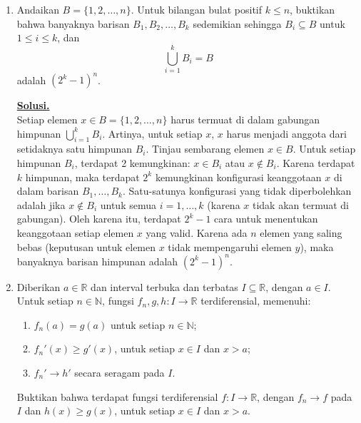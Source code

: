 \documentclass[12pt,twoside]{article}
\newenvironment{solution}
{
	\par\noindent\textbf{\underline{Solusi.}}\\
}
{
	\par
}
\begin{document}
\begin{enumerate}
  \item Andaikan $B = \{1, 2, \dots, n\}$. Untuk bilangan bulat positif $k \leq n$, buktikan bahwa banyaknya barisan $B_1, B_2, \dots, B_k$ sedemikian sehingga $B_i \subseteq B$ untuk $1 \leq i \leq k$, dan
        \[
          \bigcup_{i=1}^k B_i = B
        \]
        adalah $(2^k - 1)^n$.

        \begin{solution}
          Setiap elemen $x \in B = \{1, 2, \dots, n\}$ harus termuat di dalam gabungan himpunan $\bigcup_{i=1}^k B_i$. Artinya, untuk setiap $x$, $x$ harus menjadi anggota dari setidaknya satu himpunan $B_i$.
          Tinjau sembarang elemen $x \in B$. Untuk setiap himpunan $B_i$, terdapat 2 kemungkinan: $x \in B_i$ atau $x \notin B_i$. Karena terdapat $k$ himpunan, maka terdapat $2^k$ kemungkinan konfigurasi keanggotaan $x$ di dalam barisan $B_1, \dots, B_k$.
          Satu-satunya konfigurasi yang tidak diperbolehkan adalah jika $x \notin B_i$ untuk semua $i=1, \dots, k$ (karena $x$ tidak akan termuat di gabungan).
          Oleh karena itu, terdapat $2^k - 1$ cara untuk menentukan keanggotaan setiap elemen $x$ yang valid.
          Karena ada $n$ elemen yang saling bebas (keputusan untuk elemen $x$ tidak mempengaruhi elemen $y$), maka banyaknya barisan himpunan adalah $(2^k - 1)^n$.
        \end{solution}

  \item Diberikan $a \in \mathbb{R}$ dan interval terbuka dan terbatas $I \subseteq \mathbb{R}$, dengan $a \in I$. Untuk setiap $n \in \mathbb{N}$, fungsi $f_n, g, h : I \to \mathbb{R}$ terdiferensial, memenuhi:
        \begin{enumerate}
          \item $f_n(a) = g(a)$ untuk setiap $n \in \mathbb{N}$;
          \item $f_n'(x) \geq g'(x)$, untuk setiap $x \in I$ dan $x > a$;
          \item $f_n' \to h'$ secara seragam pada $I$.
        \end{enumerate}
        Buktikan bahwa terdapat fungsi terdiferensial $f : I \to \mathbb{R}$, dengan $f_n \to f$ pada $I$ dan $h(x) \geq g(x)$, untuk setiap $x \in I$ dan $x > a$.


\end{enumerate}
\end{document}
